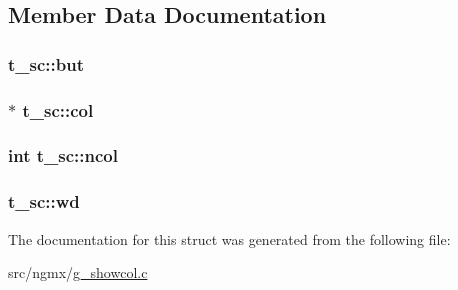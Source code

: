 \subsection{\-Member \-Data \-Documentation}
\hypertarget{structt__sc_a2293d9b539fcd335f5bb184911f966fc}{
\subsubsection[{but}]{ {\bf t\-\_\-sc\-::but}}}\label{structt__sc_a2293d9b539fcd335f5bb184911f966fc}
\hypertarget{structt__sc_ad0c8c5ad688a38599a2347e1a9f004cc}{
\subsubsection[{col}]{$\ast$ {\bf t\-\_\-sc\-::col}}}\label{structt__sc_ad0c8c5ad688a38599a2347e1a9f004cc}
\hypertarget{structt__sc_acfebce96708b67c3e2528233b29f0552}{
\subsubsection[{ncol}]{\setlength{\rightskip}{0pt plus 5cm}int {\bf t\-\_\-sc\-::ncol}}}\label{structt__sc_acfebce96708b67c3e2528233b29f0552}
\hypertarget{structt__sc_a7fe36812402fa881d1f79ee81e069f5f}{
\subsubsection[{wd}]{ {\bf t\-\_\-sc\-::wd}}}\label{structt__sc_a7fe36812402fa881d1f79ee81e069f5f}


\-The documentation for this struct was generated from the following file\-:\begin{DoxyCompactItemize}
\item 
src/ngmx/\hyperlink{g__showcol_8c}{g\-\_\-showcol.\-c}\end{DoxyCompactItemize}
